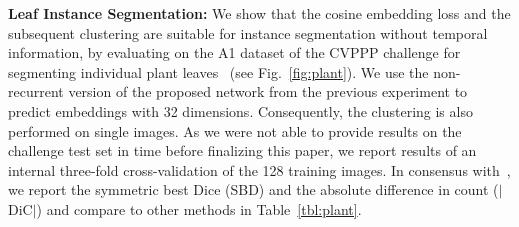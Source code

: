\documentclass[runningheads,a4paper]{llncs}
\begin{document}
\noindent\textbf{Leaf Instance Segmentation:}
We show that the cosine embedding loss and the subsequent clustering are suitable for instance segmentation without temporal information, by evaluating on the A1 dataset of the CVPPP challenge for segmenting individual plant leaves~\cite{Minervini2016} (see Fig.~\ref{fig:plant}).
We use the non-recurrent version of the proposed network from the previous experiment to predict embeddings with 32 dimensions.
Consequently, the clustering is also performed on single images.
As we were not able to provide results on the challenge test set in time before finalizing this paper, we report results of an internal three-fold cross-validation of the 128 training images.
In consensus with~\cite{Scharr2016}, we report the symmetric best Dice (SBD) and the absolute difference in count ($|$DiC$|$) and compare to other methods in Table~\ref{tbl:plant}.
\end{document}
